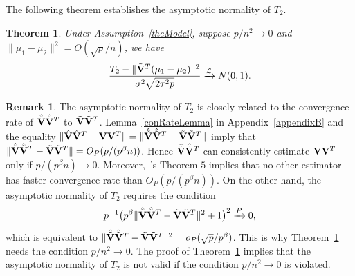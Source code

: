 \documentclass[3p]{elsarticle}
\theoremstyle{plain}
\newtheorem{theorem}{\quad\quad Theorem}
\theoremstyle{definition}
\newtheorem{remark}{\quad\quad Remark}
\theoremstyle{remark}
\begin{document}
The following theorem establishes the asymptotic normality of $T_2$.
\begin{theorem}\label{myPanpan}
    Under Assumption~\ref{theModel},
suppose $p/n^2\to 0$ and
    $\|\mu_1-\mu_2\|^2=O({\sqrt{p}}/{n})$,
    we have
\begin{equation*}
        \frac{T_2-\|\tilde{\mathbf{V}}^T(\mu_1-\mu_2)\|^2}{\sigma^2\sqrt{2\tau^2 p}}\xrightarrow{\mathcal{L}}N(0,1).
\end{equation*}
\end{theorem} 
\begin{remark}
The asymptotic normality of $T_2$ is closely related to the convergence rate of $\hat{\tilde{\mathbf{V}}}\hat{\tilde{\mathbf{V}}}^T$ to $\tilde{\mathbf{V}}\tilde{\mathbf{V}}^T$.
    Lemma~\ref{conRateLemma} in Appendix~\ref{appendixB} and the equality $\|\hat{\mathbf{V}}\hat{\mathbf{V}}^T -\mathbf{V} \mathbf{V}^T\|=\|\hat{\tilde{\mathbf{V}}}\hat{\tilde{\mathbf{V}}}^T -\tilde{\mathbf{V}} \tilde{\mathbf{V}}^T\|$ imply that 
    $\|\hat{\tilde{\mathbf{V}}}\hat{\tilde{\mathbf{V}}}^T -\tilde{\mathbf{V}} \tilde{\mathbf{V}}^T\|=O_P(p/(p^{\beta}n))$.
    Hence $\hat{\tilde{\mathbf{V}}}\hat{\tilde{\mathbf{V}}}^T$ can consistently estimate $\tilde{\mathbf{V}}\tilde{\mathbf{V}}^T$ only if $p/(p^{\beta}n)\to 0$.
    Moreover,~\cite{Cai2012Sparse}'s Theorem $5$ implies that no other estimator has faster convergence rate than $O_P(p/(p^{\beta}n))$.
    On the other hand, the asymptotic normality of $T_2$ requires the condition
    $$
    p^{-1}\big(p^{\beta}\|\hat{\tilde{\mathbf{V}}}\hat{\tilde{\mathbf{V}}}^T -\tilde{\mathbf{V}} \tilde{\mathbf{V}}^T\|^2+1\big)^2\xrightarrow{P} 0,
    $$
    which is equivalent to $\|\hat{\tilde{\mathbf{V}}}\hat{\tilde{\mathbf{V}}}^T -\tilde{\mathbf{V}} \tilde{\mathbf{V}}^T\|^2=o_P(\sqrt{p}/p^{\beta})$.
    This is why Theorem~\ref{myPanpan} needs the condition  $p/n^2\to 0$.
The proof of Theorem~\ref{myPanpan} implies that the asymptotic normality of $T_2$ is not valid if the condition $p/n^2\to 0$ is violated.
\end{remark}
\end{document}

